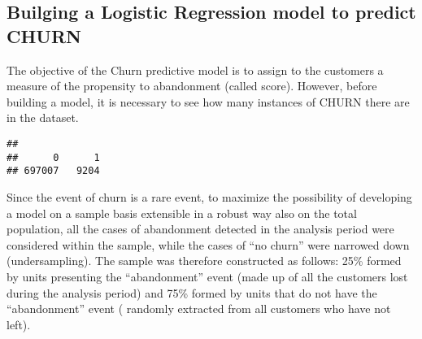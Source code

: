 \documentclass[]{article}
\newenvironment{Shaded}{\begin{snugshade}}{\end{snugshade}}
\newcommand{\KeywordTok}[1]{\textcolor[rgb]{0.13,0.29,0.53}{\textbf{#1}}}
\newcommand{\DataTypeTok}[1]{\textcolor[rgb]{0.13,0.29,0.53}{#1}}
\newcommand{\DecValTok}[1]{\textcolor[rgb]{0.00,0.00,0.81}{#1}}
\newcommand{\FloatTok}[1]{\textcolor[rgb]{0.00,0.00,0.81}{#1}}
\newcommand{\StringTok}[1]{\textcolor[rgb]{0.31,0.60,0.02}{#1}}
\newcommand{\CommentTok}[1]{\textcolor[rgb]{0.56,0.35,0.01}{\textit{#1}}}
\newcommand{\OtherTok}[1]{\textcolor[rgb]{0.56,0.35,0.01}{#1}}
\newcommand{\OperatorTok}[1]{\textcolor[rgb]{0.81,0.36,0.00}{\textbf{#1}}}
\newcommand{\NormalTok}[1]{#1}
\begin{document}
\subsection{Builging a Logistic Regression model to predict
CHURN}\label{builging-a-logistic-regression-model-to-predict-churn}

The objective of the Churn predictive model is to assign to the
customers a measure of the propensity to abandonment (called score).
However, before building a model, it is necessary to see how many
instances of CHURN there are in the dataset.

\begin{Shaded}
\end{Shaded}

\begin{verbatim}
## 
##      0      1 
## 697007   9204
\end{verbatim}

Since the event of churn is a rare event, to maximize the possibility of
developing a model on a sample basis extensible in a robust way also on
the total population, all the cases of abandonment detected in the
analysis period were considered within the sample, while the cases of
``no churn'' were narrowed down (undersampling). The sample was
therefore constructed as follows: 25\% formed by units presenting the
``abandonment'' event (made up of all the customers lost during the
analysis period) and 75\% formed by units that do not have the
``abandonment'' event ( randomly extracted from all customers who have
not left).

\begin{Shaded}
\end{Shaded}
\end{document}
